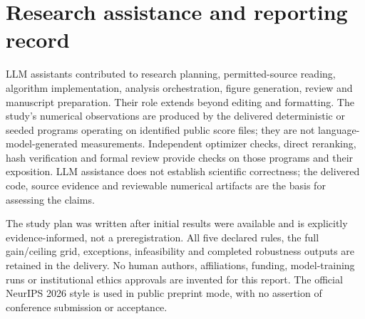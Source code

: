 \section{Research assistance and reporting record}
\label{app:assistance}
LLM assistants contributed to research planning, permitted-source reading, algorithm implementation, analysis orchestration, figure generation, review and manuscript preparation. Their role extends beyond editing and formatting. The study's numerical observations are produced by the delivered deterministic or seeded programs operating on identified public score files; they are not language-model-generated measurements. Independent optimizer checks, direct reranking, hash verification and formal review provide checks on those programs and their exposition. LLM assistance does not establish scientific correctness; the delivered code, source evidence and reviewable numerical artifacts are the basis for assessing the claims.

The study plan was written after initial results were available and is explicitly evidence-informed, not a preregistration. All five declared rules, the full gain/ceiling grid, exceptions, infeasibility and completed robustness outputs are retained in the delivery. No human authors, affiliations, funding, model-training runs or institutional ethics approvals are invented for this report. The official NeurIPS 2026 style is used in public preprint mode, with no assertion of conference submission or acceptance.
